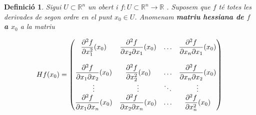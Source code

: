 \documentclass[12pt]{article}
\newtheorem{definicio}{Definici{\'o}}[subsection]
\newcommand{\R}{\mathbb{R}}
\begin{document}
%
%
%
%

\vspace{0.4cm}
\begin{definicio}
Sigui $ U \subset \R ^ n $ un obert i $ f :U \subset
\R ^ n \longrightarrow \R $ . Suposem que $f$ t{\'e} totes les derivades de segon ordre en el punt $x _0 \in U $.
Anomenam \textbf{matriu hessiana de $ f $ a $ x_0 $} a la matriu

$$
 Hf(x_0)  = \left (\begin{matrix}
   \displaystyle{\frac{\partial ^ 2 f}{\partial x_1 ^ 2} (x_0)} &
   \displaystyle{\frac{\partial ^ 2 f}{\partial x_2 \partial
x_1} (x_0)} & \ldots & \displaystyle{\frac{\partial ^ 2 f}{\partial
x_n \partial x_1} (x_0)} \\ \\  \displaystyle{\frac{\partial ^ 2 f}{\partial x_1 \partial x_2} (x_0)} &
  \displaystyle{\frac{\partial ^ 2 f}{\partial x_2 ^ 2} (x_0)}
 & \ldots & \displaystyle{\frac{\partial ^ 2 f}{\partial x_n \partial
x_2} (x_0)} \\ \vdots & \vdots & \ddots & \vdots \\  \displaystyle{\frac{\partial ^ 2 f}{\partial x_1 \partial x_n} (x_0)} &
   \displaystyle{\frac{\partial ^ 2 f}{\partial x_2 \partial
   x_n} (x_0)}
 & \ldots & \displaystyle{\frac{\partial ^ 2 f}{\partial x_n ^ 2} (x_0)} \\  \end{matrix} \right) \\
$$
\end{definicio}


%
\end{document}
